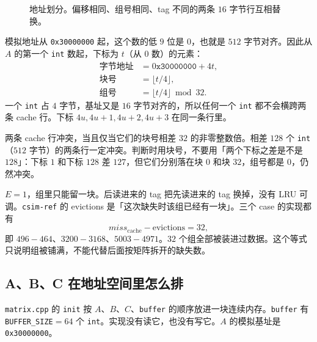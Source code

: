 \documentclass[11pt,a4paper,fontset=fandol]{ctexart}
\newcommand{\code}[1]{\texttt{#1}}
\newcommand{\mc}{\mathit{miss}_{\mathrm{cache}}}
\begin{document}
\begin{figure}[ht]
\centering
{}
\caption{地址划分。偏移相同、组号相同、tag 不同的两条 $16$ 字节行互相替换。}
\label{fig:bits}
\end{figure}

模拟地址从 \code{0x30000000} 起，这个数的低 $9$ 位是 $0$，也就是 $512$ 字节对齐。因此从 $A$ 的第一个 \code{int} 数起，下标为 $t$（从 $0$ 数）的元素：
\begin{align}
\text{字节地址}&=0\texttt{x30000000}+4t,\\
\text{块号}&=\lfloor t/4\rfloor,\\
\text{组号}&=\lfloor t/4\rfloor \bmod 32.
\label{eq:set}
\end{align}
一个 \code{int} 占 $4$ 字节，基址又是 $16$ 字节对齐的，所以任何一个 \code{int} 都不会横跨两条 cache 行。下标 $4u,4u+1,4u+2,4u+3$ 在同一条行里。

两条 cache 行冲突，当且仅当它们的块号相差 $32$ 的非零整数倍。相差 $128$ 个 \code{int}（$512$ 字节）的两条行一定冲突。判断时用块号，不要用「两个下标之差是不是 $128$」：下标 $1$ 和下标 $128$ 差 $127$，但它们分别落在块 $0$ 和块 $32$，组号都是 $0$，仍然冲突。

$E=1$，组里只能留一块。后读进来的 tag 把先读进来的 tag 换掉，没有 LRU 可调。\code{csim-ref} 的 evictions 是「这次缺失时该组已经有一块」。三个 case 的实现都有
\[
\mc-\mathrm{evictions}=32,
\]
即 $496-464$、$3200-3168$、$5003-4971$。$32$ 个组全部被装进过数据。这个等式只说明组被铺满，不能代替后面按矩阵拆开的缺失数。

\subsection{A、B、C 在地址空间里怎么排}
\label{sec:layout}

\code{matrix.cpp} 的 \code{init} 按 $A$、$B$、$C$、\code{buffer} 的顺序放进一块连续内存。\code{buffer} 有 \code{BUFFER\_SIZE}$=64$ 个 \code{int}。实现没有读它，也没有写它。$A$ 的模拟基址是 \code{0x30000000}。
\end{document}

